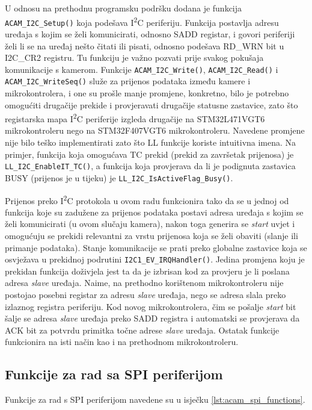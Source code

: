 \noindent U odnosu na prethodnu programsku podršku dodana je funkcija \verb|ACAM_I2C_Setup()| koja podešava I\textsuperscript{2}C periferiju. Funkcija postavlja adresu uređaja s kojim se želi komunicirati, odnosno SADD registar, i govori periferiji želi li se na uređaj nešto čitati ili pisati, odnosno podešava RD\_WRN bit u I2C\_CR2 registru. Tu funkciju je važno pozvati prije svakog pokušaja komunikacije s kamerom. Funkcije \verb|ACAM_I2C_Write()|,  \verb|ACAM_I2C_Read()| i \verb|ACAM_I2C_WriteSeq()| služe za prijenos podataka između kamere i mikrokontrolera, i one su prošle manje promjene, konkretno, bilo je potrebno omogućiti drugačije prekide i provjeravati drugačije statusne zastavice, zato što registarska mapa I\textsuperscript{2}C periferije izgleda drugačije na STM32L471VGT6 mikrokontroleru nego na STM32F407VGT6 mikrokontroleru. Navedene promjene nije bilo teško implementirati zato što LL funkcije koriste intuitivna imena. Na primjer, funkcija koja omogućava TC prekid (prekid za završetak prijenosa) je \verb|LL_I2C_EnableIT_TC()|, a funkcija koja provjerava da li je podignuta zastavica BUSY (prijenos je u tijeku) je \verb|LL_I2C_IsActiveFlag_Busy()|.

Prijenos preko I\textsuperscript{2}C protokola u ovom radu funkcionira tako da se u jednoj od funkcija koje su zadužene za prijenos podataka postavi adresa uređaja s kojim se želi komunicirati (u ovom slučaju kamera), nakon toga generira se \textit{start} uvjet i omogućuju se prekidi relevantni za vrstu prijenosa koja se želi obaviti (slanje ili primanje podataka). Stanje komunikacije se prati preko globalne zastavice koja se osvježava u prekidnoj podrutini \verb|I2C1_EV_IRQHandler()|. Jedina promjena koju je prekidan funkcija doživjela jest ta da je izbrisan kod za provjeru je li poslana adresa \textit{slave} uređaja. Naime, na prethodno korištenom mikrokontroleru nije postojao posebni registar za adresu \textit{slave} uređaja, nego se adresa slala preko izlaznog registra periferiju. Kod novog mikrokontrolera, čim se pošalje \textit{start} bit šalje se adresa \textit{slave} uređaja preko SADD registra i automatski se provjerava da ACK bit za potvrdu primitka točne adrese \textit{slave} uređaja. Ostatak funkcije funkcionira na isti način kao i na prethodnom mikrokontroleru.

\subsection{Funkcije za rad sa SPI periferijom}

Funkcije za rad s SPI periferijom navedene su u isječku \ref{lst:acam_spi_functions}.

